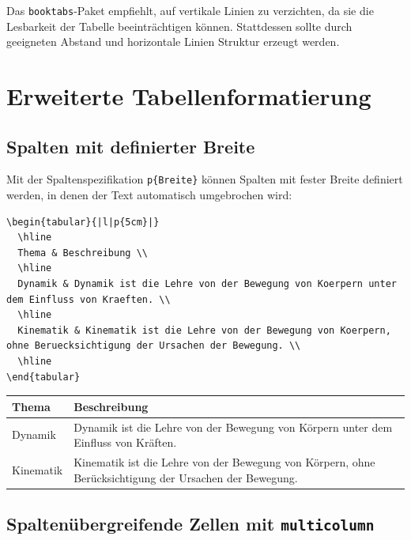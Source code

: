 \documentclass[12pt,a4paper]{article}
\begin{document}
Das \texttt{booktabs}-Paket empfiehlt, auf vertikale Linien zu verzichten, da sie die Lesbarkeit der Tabelle beeinträchtigen können. Stattdessen sollte durch geeigneten Abstand und horizontale Linien Struktur erzeugt werden.

\section{Erweiterte Tabellenformatierung}

\subsection{Spalten mit definierter Breite}

Mit der Spaltenspezifikation \texttt{p\{Breite\}} können Spalten mit fester Breite definiert werden, in denen der Text automatisch umgebrochen wird:

\begin{lstlisting}[style=latex]
\begin{tabular}{|l|p{5cm}|}
  \hline
  Thema & Beschreibung \\
  \hline
  Dynamik & Dynamik ist die Lehre von der Bewegung von Koerpern unter dem Einfluss von Kraeften. \\
  \hline
  Kinematik & Kinematik ist die Lehre von der Bewegung von Koerpern, ohne Beruecksichtigung der Ursachen der Bewegung. \\
  \hline
\end{tabular}
\end{lstlisting}

\begin{ausgabe}
\begin{center}
\begin{tabular}{|l|p{5cm}|}
  \hline
  Thema & Beschreibung \\
  \hline
  Dynamik & Dynamik ist die Lehre von der Bewegung von Körpern unter dem Einfluss von Kräften. \\
  \hline
  Kinematik & Kinematik ist die Lehre von der Bewegung von Körpern, ohne Berücksichtigung der Ursachen der Bewegung. \\
  \hline
\end{tabular}
\end{center}
\end{ausgabe}

\subsection{Spaltenübergreifende Zellen mit \texttt{multicolumn}}
\end{document}
